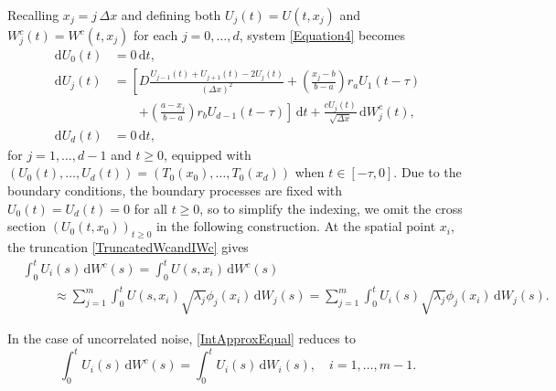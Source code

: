 \documentclass[onefignum]{siamart250211}
\begin{document}
\begin{example}
Recalling $x_j=j\,\Delta x$ and defining both $U_j(t)=U(t,x_j)$ and $W^c_j(t)=W^c(t,x_j)$ for each $j=0,\ldots,d$, system \cref{Equation4} becomes
\begin{align}
\mathrm{d}U_0(t)&=0\,\mathrm{d}t,\label{BigSDDESystem}\\
\mathrm{d}U_j(t)&=\left[D\frac{U_{j-1}(t)+U_{j+1}(t)-2U_j(t)}{(\Delta x)^2}+\left(\frac{x_j-b}{b-a}\right)r_aU_1(t-\tau)\right.\nonumber\\
&\quad\quad\left.+\left(\frac{a-x_j}{b-a}\right)r_bU_{d-1}(t-\tau)\right]\,\mathrm{d}t+\frac{cU_j(t)}{\sqrt{\Delta x}}\,\mathrm{d}W_j^c(t),\nonumber\\
\mathrm{d}U_d(t)&=0\,\mathrm{d}t,\nonumber
\end{align}
for $j=1,\ldots,d-1$ and $t\geqslant0$, equipped with $(U_0(t),\ldots,U_d(t))=(T_0(x_0),\ldots,T_0(x_d))$ when $t\in[-\tau,0]$. Due to the boundary conditions, the boundary processes are fixed with $U_0(t)=U_d(t)=0$ for all $t\geqslant0$, so to simplify the indexing, we omit the cross section $(U_0(t,x_0))_{t\geqslant0}$ in the following construction. At the spatial point $x_i$, the truncation \cref{TruncatedWcandIWc} gives
\begin{align}
&\int_0^tU_i(s)\,\mathrm{d}W^c(s)=\int_0^tU(s,x_i)\,\mathrm{d}W^c(s)\label{IntApproxEqual}\\
&\hspace{1cm}\approx\sum_{j=1}^m\int_0^tU(s,x_i)\sqrt{\lambda_j}\phi_j(x_i)\,\mathrm{d}W_j(s)=\sum_{j=1}^m\int_0^tU_i(s)\sqrt{\lambda_j}\phi_j(x_i)\,\mathrm{d}W_j(s).\nonumber
\end{align}
\begin{remark}
In the case of uncorrelated noise, \cref{IntApproxEqual} reduces to
\[\int_0^tU_i(s)\,\mathrm{d}W^c(s)=\int_0^tU_i(s)\,\mathrm{d}W_i(s),\quad i=1,\ldots,m-1.\]
\end{remark}


\end{example}
\end{document}
